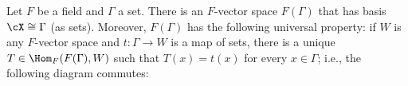     \begin{theorem}
        Let $F$ be a field and $\Gamma$ a set. There is an $F$-vector space $F(\Gamma)$ that has basis $\cX \cong \Gamma$ (as sets). Moreover, $F(\Gamma)$ has the following universal property: if $W$ is any $F$-vector space and $t:\Gamma \rightarrow W$ is a map of sets, there is a unique $T \in \Hom_F(F(\Gamma),W)$ such that $T(x) = t(x)$ for every $x \in \Gamma$; i.e., the following diagram commutes:
            \begin{center}
            \end{center}
    \end{theorem}
